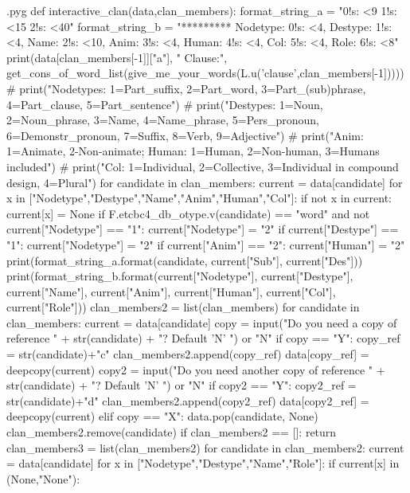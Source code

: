 \documentclass{report}
\makeatletter
\newenvironment{python}{%
  \VerbatimEnvironment
  \minted@resetoptions
  \setkeys{minted@opt}{}
      \begin{VerbatimOut}{\jobname.pyg}}
{%
      \end{VerbatimOut}
      \minted@pygmentize{python}
      \DeleteFile{\jobname.pyg}}
\makeatother
\begin{document}
\begin{python}
def interactive_clan(data,clan_members):
    format_string_a = "{0!s: <9} {1!s: <15} {2!s: <40}"
    format_string_b = "********* Nodetype: {0!s: <4}, Destype: {1!s: <4}, Name: {2!s: <10}, Anim: {3!s: <4}, Human: {4!s: <4}, Col: {5!s: <4}, Role: {6!s: <8}"
    print(data[clan_members[-1]]["a"], " Clause:", get_cons_of_word_list(give_me_your_words(L.u('clause',clan_members[-1]))))
#    print("Nodetypes: 1=Part_suffix, 2=Part_word, 3=Part_(sub)phrase, 4=Part_clause, 5=Part_sentence")
#    print("Destypes: 1=Noun, 2=Noun_phrase, 3=Name, 4=Name_phrase, 5=Pers_pronoun, 6=Demonstr_pronoun, 7=Suffix, 8=Verb, 9=Adjective")
#    print("Anim: 1=Animate, 2-Non-animate; Human: 1=Human, 2=Non-human, 3=Humans included")
#    print("Col: 1=Individual, 2=Collective, 3=Individual in compound design, 4=Plural")
    for candidate in clan_members:
        current = data[candidate]
        for x in ["Nodetype","Destype","Name","Anim","Human","Col"]:
            if not x in current:
                current[x] = None
        if F.etcbc4_db_otype.v(candidate) == "word" and not current["Nodetype"] == "1":
            current["Nodetype"] = "2"
        if current["Destype"] == "1":
            current["Nodetype"] = "2"
        if current["Anim"] == "2":
            current["Human"] = "2"
        print(format_string_a.format(candidate, current["Sub"], current["Des"]))
        print(format_string_b.format(current["Nodetype"], current["Destype"], current["Name"], current["Anim"], current["Human"], current["Col"], current["Role"]))
    clan_members2 = list(clan_members)
    for candidate in clan_members:
        current = data[candidate]
        copy = input("Do you need a copy of reference " + str(candidate) + "? Default 'N' ") or "N"
        if copy == "Y":
            copy_ref = str(candidate)+"c"
            clan_members2.append(copy_ref)
            data[copy_ref] = deepcopy(current)
            copy2 = input("Do you need another copy of reference " + str(candidate) + "? Default 'N' ") or "N"
            if copy2 == "Y":
                copy2_ref = str(candidate)+"d"
                clan_members2.append(copy2_ref)
                data[copy2_ref] = deepcopy(current)
        elif copy == "X":
            data.pop(candidate, None)
            clan_members2.remove(candidate)
            if clan_members2 == []:
                return
    clan_members3 = list(clan_members2)
    for candidate in clan_members2:
        current = data[candidate]
        for x in ["Nodetype","Destype","Name","Role"]:
            if current[x] in (None,"None"):

\end{python}
\end{document}
